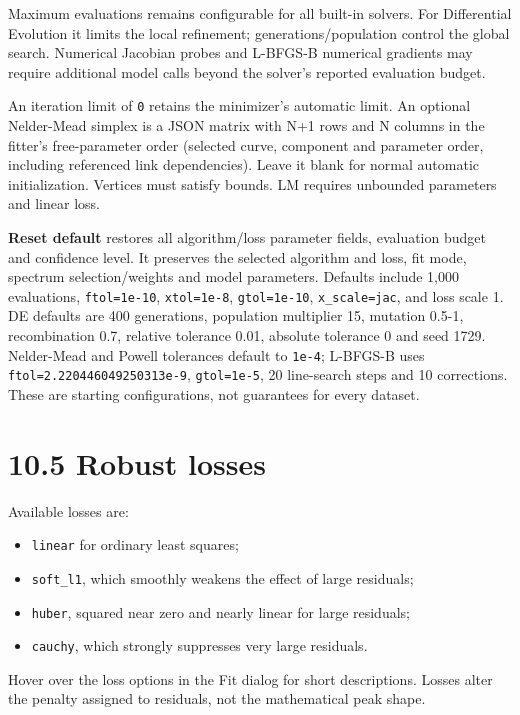 \documentclass[
  10pt,
  a4paper,
  oneside]{scrreprt}
\providecommand{\tightlist}{%
  \setlength{\itemsep}{0pt}\setlength{\parskip}{0pt}}
\begin{document}
Maximum evaluations remains configurable for all built-in solvers. For
Differential Evolution it limits the local refinement;
generations/population control the global search. Numerical Jacobian
probes and L-BFGS-B numerical gradients may require additional model
calls beyond the solver's reported evaluation budget.

An iteration limit of \texttt{0} retains the minimizer's automatic
limit. An optional Nelder-Mead simplex is a JSON matrix with N+1 rows
and N columns in the fitter's free-parameter order (selected curve,
component and parameter order, including referenced link dependencies).
Leave it blank for normal automatic initialization. Vertices must
satisfy bounds. LM requires unbounded parameters and linear loss.

\textbf{Reset default} restores all algorithm/loss parameter fields,
evaluation budget and confidence level. It preserves the selected
algorithm and loss, fit mode, spectrum selection/weights and model
parameters. Defaults include 1,000 evaluations, \texttt{ftol=1e-10},
\texttt{xtol=1e-8}, \texttt{gtol=1e-10}, \texttt{x\_scale=jac}, and loss
scale 1. DE defaults are 400 generations, population multiplier 15,
mutation 0.5-1, recombination 0.7, relative tolerance 0.01, absolute
tolerance 0 and seed 1729. Nelder-Mead and Powell tolerances default to
\texttt{1e-4}; L-BFGS-B uses \texttt{ftol=2.220446049250313e-9},
\texttt{gtol=1e-5}, 20 line-search steps and 10 corrections. These are
starting configurations, not guarantees for every dataset.

\hypertarget{robust-losses}{%
\section{10.5 Robust losses}\label{robust-losses}}

Available losses are:

\begin{itemize}
\tightlist
\item
  \texttt{linear} for ordinary least squares;
\item
  \texttt{soft\_l1}, which smoothly weakens the effect of large
  residuals;
\item
  \texttt{huber}, squared near zero and nearly linear for large
  residuals;
\item
  \texttt{cauchy}, which strongly suppresses very large residuals.
\end{itemize}

Hover over the loss options in the Fit dialog for short descriptions.
Losses alter the penalty assigned to residuals, not the mathematical
peak shape.
\end{document}
